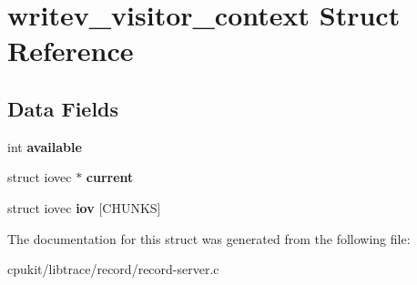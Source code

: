 \hypertarget{structwritev__visitor__context}{}\section{writev\+\_\+visitor\+\_\+context Struct Reference}
\label{structwritev__visitor__context}
\subsection*{Data Fields}
\begin{DoxyCompactItemize}
\item 
\mbox{\label{structwritev__visitor__context_a66c8460ec8311d548643576467d3185e}} 
int {\bfseries available}
\item 
\mbox{\label{structwritev__visitor__context_ae4b06dd2fbf3b8bf2d1c08c8d6c4e5ed}} 
struct iovec $\ast$ {\bfseries current}
\item 
\mbox{\label{structwritev__visitor__context_a403d0811ae38768c72b517f2f82213fd}} 
struct iovec {\bfseries iov} \mbox{[}C\+H\+U\+N\+KS\mbox{]}
\end{DoxyCompactItemize}


The documentation for this struct was generated from the following file\+:\begin{DoxyCompactItemize}
\item 
cpukit/libtrace/record/record-\/server.\+c\end{DoxyCompactItemize}
